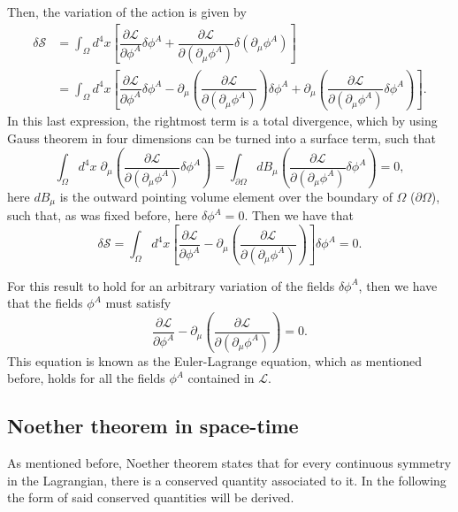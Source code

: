 Then, the variation of the action is given by
\begin{align*}
    \delta\mathcal{S} &= \int_{\Omega}d^4x \left[ \dfrac{\partial\mathcal{L}}{\partial\phi^A}\delta\phi^A + \dfrac{\partial\mathcal{L}}{\partial(\partial_{\mu}\phi^A)}\delta(\partial_{\mu}\phi^A) \right] \\
    &= \int_{\Omega}d^4x \left[ \dfrac{\partial\mathcal{L}}{\partial\phi^A}\delta\phi^A - \partial_{\mu}\left( \dfrac{\partial\mathcal{L}}{\partial(\partial_{\mu}\phi^A)} \right)\delta\phi^A + \partial_{\mu}\left( \dfrac{\partial\mathcal{L}}{\partial(\partial_{\mu}\phi^A)}\delta\phi^A \right) \right].
\end{align*}
In this last expression, the rightmost term is a total divergence, which by using Gauss theorem in four dimensions can be turned into a surface term, such that
\begin{equation*}
    \int_{\Omega} d^4x \; \partial_{\mu}\left( \dfrac{\partial\mathcal{L}}{\partial(\partial_{\mu}\phi^A)}\delta\phi^A \right) = \int_{\partial\Omega} dB_{\mu} \left( \dfrac{\partial\mathcal{L}}{\partial(\partial_{\mu}\phi^A)}\delta\phi^A \right) = 0,
\end{equation*}
here $dB_{\mu}$ is the outward pointing volume element over the boundary of $\Omega$ ($\partial\Omega$), such that, as was fixed before, here $\delta\phi^A = 0$. Then we have that
\begin{equation*}
    \delta\mathcal{S} = \int_{\Omega}d^4x \left[ \dfrac{\partial\mathcal{L}}{\partial\phi^A} - \partial_{\mu}\left( \dfrac{\partial\mathcal{L}}{\partial(\partial_{\mu}\phi^A)} \right) \right]\delta\phi^A = 0.
\end{equation*}

For this result to hold for an arbitrary variation of the fields $\delta\phi^A$, then we have that the fields $\phi^A$ must satisfy
\begin{equation*}
    \dfrac{\partial\mathcal{L}}{\partial\phi^A} - \partial_{\mu}\left( \dfrac{\partial\mathcal{L}}{\partial(\partial_{\mu}\phi^A)} \right) = 0.
\end{equation*}
This equation is known as the Euler-Lagrange equation, which as mentioned before, holds for all the fields $\phi^A$ contained in $\mathcal{L}$.

\subsection{Noether theorem in space-time}

As mentioned before, Noether theorem states that for every continuous symmetry in the Lagrangian, there is a conserved quantity associated to it. In the following  the form of said conserved quantities will be derived.

